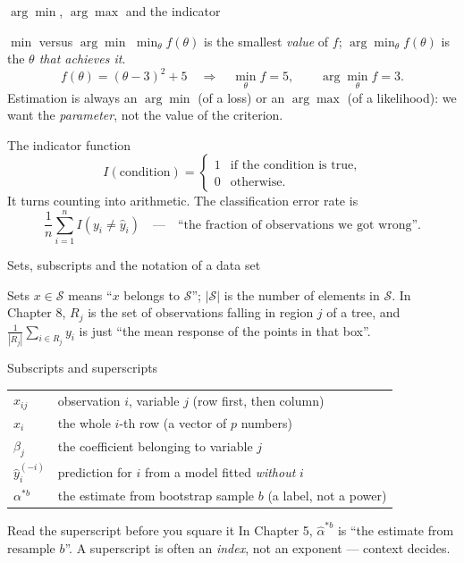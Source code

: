 \documentclass[aspectratio=169,11pt]{beamer}
\begin{document}
\begin{frame}{$\arg\min$, $\arg\max$ and the indicator}\label{frm:argmin}
  \footnotesize
  \begin{block}{$\min$ versus $\arg\min$}
    $\min_\theta f(\theta)$ is the smallest \emph{value} of $f$;
    $\arg\min_\theta f(\theta)$ is the \emph{$\theta$ that achieves it}.
    \[
      f(\theta) = (\theta-3)^2 + 5
      \quad\Longrightarrow\quad
      \min_\theta f = 5, \qquad \arg\min_\theta f = 3 .
    \]
    Estimation is always an $\arg\min$ (of a loss) or an $\arg\max$ (of a
    likelihood): we want the \emph{parameter}, not the value of the criterion.
  \end{block}
  \begin{block}{The indicator function}
    \[
      I(\text{condition}) =
      \begin{cases} 1 & \text{if the condition is true},\\ 0 & \text{otherwise.}\end{cases}
    \]
    It turns counting into arithmetic. The classification error rate is
    \[
      \frac{1}{n}\sum_{i=1}^{n} I(y_i \ne \hat y_i)
      \quad\text{---}\quad
      \text{``the fraction of observations we got wrong''.}
    \]
  \end{block}
\end{frame}

\begin{frame}{Sets, subscripts and the notation of a data set}
  \footnotesize
  \begin{block}{Sets}
    $x \in \mathcal{S}$ means ``$x$ belongs to $\mathcal{S}$'';
    $|\mathcal{S}|$ is the number of elements in $\mathcal{S}$.
    In Chapter 8, $R_j$ is the set of observations falling in region $j$ of a
    tree, and $\frac{1}{|R_j|}\sum_{i \in R_j} y_i$ is just ``the mean response
    of the points in that box''.
  \end{block}
  \begin{block}{Subscripts and superscripts}
    \begin{tabular}{@{}ll@{}}
      $x_{ij}$ & observation $i$, variable $j$ (row first, then column) \\
      $x_i$ & the whole $i$-th row (a vector of $p$ numbers) \\
      $\beta_j$ & the coefficient belonging to variable $j$ \\
      $\hat y_i^{(-i)}$ & prediction for $i$ from a model fitted \emph{without} $i$ \\
      $\alpha^{*b}$ & the estimate from bootstrap sample $b$ (a label, not a power) \\
    \end{tabular}
  \end{block}
  \begin{alertblock}{Read the superscript before you square it}
    In Chapter 5, $\hat\alpha^{*b}$ is ``the estimate from resample $b$''.
    A superscript is often an \emph{index}, not an exponent --- context decides.
  \end{alertblock}
\end{frame}
\end{document}
